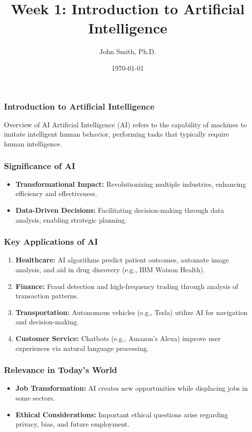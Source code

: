 \documentclass[aspectratio=169]{beamer}
\title[Week 1: Introduction to AI]{Week 1: Introduction to Artificial Intelligence}
\author[J. Smith]{John Smith, Ph.D.}
\institute[University Name]{
  Department of Computer Science\\
  University Name\\
  \vspace{0.3cm}
  Email: email@university.edu\\
  Website: www.university.edu
}
\date{\today}
\begin{document}
\frame{\titlepage}

\begin{frame}[fragile]
    \frametitle{Introduction to Artificial Intelligence}
    \begin{block}{Overview of AI}
        Artificial Intelligence (AI) refers to the capability of machines to imitate intelligent human behavior, performing tasks that typically require human intelligence.
    \end{block}
\end{frame}

\begin{frame}[fragile]
    \frametitle{Significance of AI}
    \begin{itemize}
        \item \textbf{Transformational Impact:} Revolutionizing multiple industries, enhancing efficiency and effectiveness.
        \item \textbf{Data-Driven Decisions:} Facilitating decision-making through data analysis, enabling strategic planning.
    \end{itemize}
\end{frame}

\begin{frame}[fragile]
    \frametitle{Key Applications of AI}
    \begin{enumerate}
        \item \textbf{Healthcare:} AI algorithms predict patient outcomes, automate image analysis, and aid in drug discovery (e.g., IBM Watson Health).
        \item \textbf{Finance:} Fraud detection and high-frequency trading through analysis of transaction patterns.
        \item \textbf{Transportation:} Autonomous vehicles (e.g., Tesla) utilize AI for navigation and decision-making.
        \item \textbf{Customer Service:} Chatbots (e.g., Amazon’s Alexa) improve user experiences via natural language processing.
    \end{enumerate}
\end{frame}

\begin{frame}[fragile]
    \frametitle{Relevance in Today's World}
    \begin{itemize}
        \item \textbf{Job Transformation:} AI creates new opportunities while displacing jobs in some sectors.
        \item \textbf{Ethical Considerations:} Important ethical questions arise regarding privacy, bias, and future employment.
    \end{itemize}
\end{frame}
\end{document}
